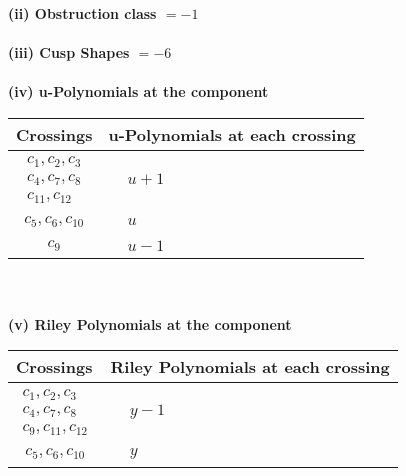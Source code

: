 \documentclass[1p]{elsarticle_modified}
\theoremstyle{definition}
\begin{document}
\flushleft \textbf{(ii) Obstruction class $= -1$}\\~\\
\flushleft \textbf{(iii) Cusp Shapes $= -6$}\\~\\
\newpage\renewcommand{\arraystretch}{1}
\flushleft \textbf{(iv) u-Polynomials at the component}\newline \\
\begin{tabular}{m{50pt}|m{274pt}}
Crossings & \hspace{64pt}u-Polynomials at each crossing \\
\hline $$\begin{aligned}c_{1},c_{2},c_{3}\\c_{4},c_{7},c_{8}\\c_{11},c_{12}\end{aligned}$$&$\begin{aligned}
&u+1
\end{aligned}$\\
\hline $$\begin{aligned}c_{5},c_{6},c_{10}\end{aligned}$$&$\begin{aligned}
&u
\end{aligned}$\\
\hline $$\begin{aligned}c_{9}\end{aligned}$$&$\begin{aligned}
&u-1
\end{aligned}$\\
\hline
\end{tabular}\\~\\
\newpage\renewcommand{\arraystretch}{1}
\flushleft \textbf{(v) Riley Polynomials at the component}\newline \\
\begin{tabular}{m{50pt}|m{274pt}}
Crossings & \hspace{64pt}Riley Polynomials at each crossing \\
\hline $$\begin{aligned}c_{1},c_{2},c_{3}\\c_{4},c_{7},c_{8}\\c_{9},c_{11},c_{12}\end{aligned}$$&$\begin{aligned}
&y-1
\end{aligned}$\\
\hline $$\begin{aligned}c_{5},c_{6},c_{10}\end{aligned}$$&$\begin{aligned}
&y
\end{aligned}$\\
\hline
\end{tabular}\\~\\
\end{document}
